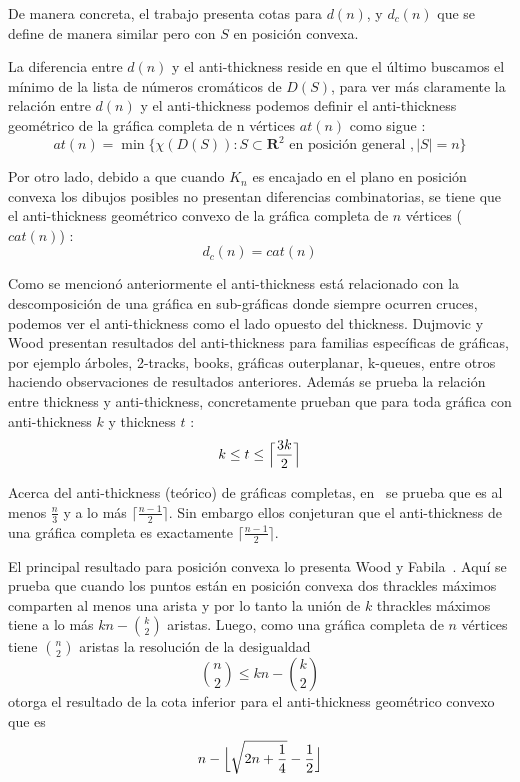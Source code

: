 De manera concreta, el trabajo presenta cotas para $d(n)$, y $d_c(n)$ que se define
de manera similar pero con $S$ en posición convexa.

La diferencia entre $d(n)$ y el anti-thickness reside en que el último buscamos el
mínimo de la lista de números cromáticos de $D(S)$, para ver más claramente
la relación entre $d(n)$ y el anti-thickness podemos definir el
anti-thickness geométrico de la gráfica completa de n vértices $at(n)$ como sigue :
\[ at(n) = \min\{\chi(D(S)): S \subset \mathbf{R}^2 \text{ en posición general }, |S|=n\}\]

Por otro lado, debido a que cuando $K_n$ es encajado en el plano en posición convexa
los dibujos posibles no presentan diferencias combinatorias, se tiene que el
anti-thickness geométrico convexo de la gráfica completa de $n$ vértices ($cat(n)$) :
\[ d_c(n) = cat(n)\]

Como se mencionó anteriormente el anti-thickness está relacionado con la descomposición
de una gráfica en sub-gráficas donde siempre ocurren cruces, podemos ver el
anti-thickness como el lado opuesto del thickness. Dujmovic y Wood \cite{Dujmovic2017} presentan resultados
del anti-thickness para familias específicas de gráficas, por ejemplo árboles, 2-tracks, books, gráficas
outerplanar, k-queues, entre otros haciendo observaciones de resultados anteriores.
Además se prueba la relación entre thickness y anti-thickness, concretamente prueban que
para toda gráfica con anti-thickness $k$ y thickness $t$
: \[ k \leq t \leq \Bigl\lceil \frac{3k}{2}\Bigr\rceil \]

Acerca del anti-thickness (teórico) de gráficas completas, en~\cite{Dujmovic2017}
se prueba que es al menos $\frac{n}{3}$ y a lo más $\lceil \frac{n-1}{2} \rceil$.
Sin embargo ellos conjeturan que el anti-thickness de una gráfica completa es
exactamente $\lceil \frac{n-1}{2} \rceil$.


El principal resultado para posición convexa lo presenta Wood y Fabila~\cite{Fabila-Monroy2018}.
Aquí se prueba que cuando los puntos están en posición convexa dos thrackles máximos
comparten al menos una arista y por lo tanto la unión de $k$ thrackles máximos tiene
a lo más $kn - \binom{k}{2}$ aristas. Luego, como una gráfica completa de $n$
vértices tiene $\binom{n}{2}$ aristas la resolución de la desigualdad
\[ \binom{n}{2} \leq kn - \binom{k}{2} \]
otorga el resultado de la cota inferior para el anti-thickness geométrico convexo que es
\[ n - \Bigl\lfloor \sqrt{2n + \frac{1}{4}} - \frac{1}{2} \Bigr\rfloor \]

